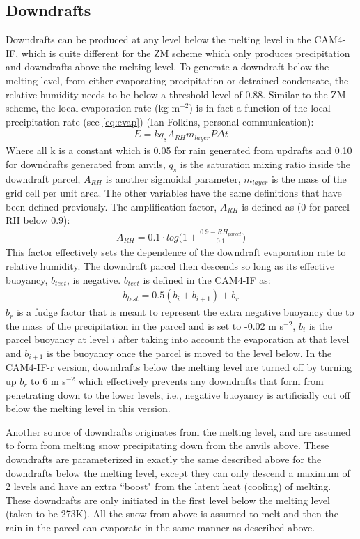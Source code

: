 \documentclass[letterpaper,12pt,titlepage,oneside,final]{book}
\begin{document}
\subsection{Downdrafts}\label{ifdown}
Downdrafts can be produced at any level below the melting level in the CAM4-IF, which is quite different for the ZM scheme which only produces precipitation and downdrafts above the melting level. To generate a downdraft below the melting level, from either evaporating precipitation or detrained condensate, the relative humidity needs to be below a threshold level of 0.88. Similar to the ZM scheme, the local evaporation rate (kg m$^{-2}$) is in fact a function of the local precipitation rate (see \ref{eq:evap}) (Ian Folkins, personal communication):
\begin{align}
E=kq_{s}A_{RH}m_{layer}P\Delta{t}
\end{align}
Where all k is a constant which is 0.05 for rain generated from updrafts and 0.10 for downdrafts generated from anvils, $q_{s}$ is the saturation mixing ratio inside the downdraft parcel, $A_{RH}$ is another sigmoidal parameter, $m_{layer}$ is the mass of the grid cell per unit area. The other variables have the same definitions that have been defined previously. The amplification factor, $A_{RH}$ is defined as (0 for parcel RH below 0.9):
\begin{align}
A_{RH}=0.1\cdot{log}\bigg(1+\frac{0.9-RH_{parcel}}{0.1}\bigg)
\end{align} 
This factor effectively sets the dependence of the downdraft evaporation rate to relative humidity. The downdraft parcel then descends so long as its effective buoyancy, $b_{test}$, is negative. $b_{test}$ is defined in the CAM4-IF as:
\begin{align}
b_{test}=0.5(b_{i}+b_{i+1})+b_{r}
\end{align}
$b_{r}$ is a fudge factor that is meant to represent the extra negative buoyancy due to the mass of the precipitation in the parcel and is set to -0.02 m s$^{-2}$, $b_{i}$ is the parcel buoyancy at level $i$ after taking into account the evaporation at that level and $b_{i+1}$ is the buoyancy once the parcel is moved to the level below. In the CAM4-IF-r version, downdrafts below the melting level are turned off by turning up $b_{r}$ to 6 m s$^{-2}$ which effectively prevents any downdrafts that form from penetrating down to the lower levels, i.e., negative buoyancy is artificially cut off below the melting level in this version. 

Another source of downdrafts originates from the melting level, and are assumed to form from melting snow precipitating down from the anvils above. These downdrafts are parameterized in exactly the same described above for the downdrafts below the melting level, except they can only descend a maximum of 2 levels and have an extra ``boost" from the latent heat (cooling) of melting. These downdrafts are only initiated in the first level below the melting level (taken to be 273K). All the snow from above is assumed to melt and then the rain in the parcel can evaporate in the same manner as described above.
\end{document}
